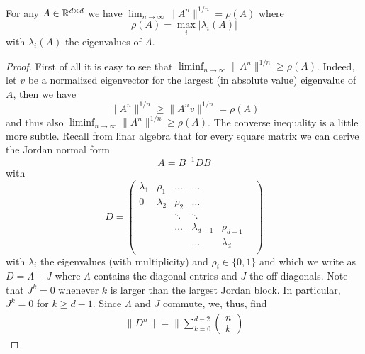\begin{lemma}\label{acceleration:lemma:spectral_radius}
    For any $A\in \mathbb{R}^{d\times d}$ we have $\lim_{n\rightarrow\infty}\|A^n\|^{1/n} = \rho(A)$ where 
    \begin{equation}
        \rho(A) = \max_{i}|\lambda_i(A)|
    \end{equation}
    with $\lambda_i(A)$ the eigenvalues of $A$.
\end{lemma}
\begin{proof}
    First of all it is easy to see that $\liminf_{n\rightarrow\infty}\|A^n\|^{1/n} \geq \rho(A)$. Indeed, let $v$ be a normalized eigenvector for the largest (in absolute value) eigenvalue of $A$, then we have
    \begin{equation}
        \|A^n\|^{1/n} \geq \|A^n v\|^{1/n} = \rho(A)
    \end{equation}
    and thus also $\liminf_{n\rightarrow\infty}\|A^n\|^{1/n} \geq \rho(A)$.
    The converse inequality is a little more subtle.
    Recall from linar algebra that for every square matrix we can derive the Jordan normal form
    \begin{equation}
        A = B^{-1}D B
    \end{equation}
    with 
    \begin{equation}
        D = \begin{pmatrix}
            \lambda_1& \rho_1 & \dots&\dots&\\
            0 & \lambda_2& \rho_2&\dots&\\
            &&\ddots&\ddots&\\
            & &\dots & \lambda_{d-1}&\rho_{d-1}&\\
            & & &\dots&\lambda_d\\
        \end{pmatrix}
    \end{equation}
    with $\lambda_i$ the eigenvalues (with multiplicity) and $\rho_i\in \{0,1\}$ and which we write as $D=\Lambda + J$ where $\Lambda$ contains the diagonal entries and $J$ the off diagonals. Note that $J^k=0$ whenever $k$ is larger than the largest Jordan block. In particular, $J^k=0$ for $k\geq d-1$. Since $\Lambda$ and $J$ commute, we, thus, find
    \begin{equation}
        \begin{aligned}
            \|D^n\| = 
            \|\sum_{k=0}^{d-2}
            \begin{pmatrix}
                n\\
                k

\end{pmatrix}
\end{aligned}
\end{equation}
\end{proof}
